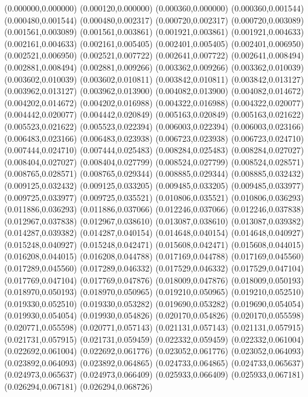 (0.000000,0.000000)
(0.000120,0.000000)
(0.000360,0.000000)
(0.000360,0.001544)
(0.000480,0.001544)
(0.000480,0.002317)
(0.000720,0.002317)
(0.000720,0.003089)
(0.001561,0.003089)
(0.001561,0.003861)
(0.001921,0.003861)
(0.001921,0.004633)
(0.002161,0.004633)
(0.002161,0.005405)
(0.002401,0.005405)
(0.002401,0.006950)
(0.002521,0.006950)
(0.002521,0.007722)
(0.002641,0.007722)
(0.002641,0.008494)
(0.002881,0.008494)
(0.002881,0.009266)
(0.003362,0.009266)
(0.003362,0.010039)
(0.003602,0.010039)
(0.003602,0.010811)
(0.003842,0.010811)
(0.003842,0.013127)
(0.003962,0.013127)
(0.003962,0.013900)
(0.004082,0.013900)
(0.004082,0.014672)
(0.004202,0.014672)
(0.004202,0.016988)
(0.004322,0.016988)
(0.004322,0.020077)
(0.004442,0.020077)
(0.004442,0.020849)
(0.005163,0.020849)
(0.005163,0.021622)
(0.005523,0.021622)
(0.005523,0.022394)
(0.006003,0.022394)
(0.006003,0.023166)
(0.006483,0.023166)
(0.006483,0.023938)
(0.006723,0.023938)
(0.006723,0.024710)
(0.007444,0.024710)
(0.007444,0.025483)
(0.008284,0.025483)
(0.008284,0.027027)
(0.008404,0.027027)
(0.008404,0.027799)
(0.008524,0.027799)
(0.008524,0.028571)
(0.008765,0.028571)
(0.008765,0.029344)
(0.008885,0.029344)
(0.008885,0.032432)
(0.009125,0.032432)
(0.009125,0.033205)
(0.009485,0.033205)
(0.009485,0.033977)
(0.009725,0.033977)
(0.009725,0.035521)
(0.010806,0.035521)
(0.010806,0.036293)
(0.011886,0.036293)
(0.011886,0.037066)
(0.012246,0.037066)
(0.012246,0.037838)
(0.012967,0.037838)
(0.012967,0.038610)
(0.013087,0.038610)
(0.013087,0.039382)
(0.014287,0.039382)
(0.014287,0.040154)
(0.014648,0.040154)
(0.014648,0.040927)
(0.015248,0.040927)
(0.015248,0.042471)
(0.015608,0.042471)
(0.015608,0.044015)
(0.016208,0.044015)
(0.016208,0.044788)
(0.017169,0.044788)
(0.017169,0.045560)
(0.017289,0.045560)
(0.017289,0.046332)
(0.017529,0.046332)
(0.017529,0.047104)
(0.017769,0.047104)
(0.017769,0.047876)
(0.018009,0.047876)
(0.018009,0.050193)
(0.018970,0.050193)
(0.018970,0.050965)
(0.019210,0.050965)
(0.019210,0.052510)
(0.019330,0.052510)
(0.019330,0.053282)
(0.019690,0.053282)
(0.019690,0.054054)
(0.019930,0.054054)
(0.019930,0.054826)
(0.020170,0.054826)
(0.020170,0.055598)
(0.020771,0.055598)
(0.020771,0.057143)
(0.021131,0.057143)
(0.021131,0.057915)
(0.021731,0.057915)
(0.021731,0.059459)
(0.022332,0.059459)
(0.022332,0.061004)
(0.022692,0.061004)
(0.022692,0.061776)
(0.023052,0.061776)
(0.023052,0.064093)
(0.023892,0.064093)
(0.023892,0.064865)
(0.024733,0.064865)
(0.024733,0.065637)
(0.024973,0.065637)
(0.024973,0.066409)
(0.025933,0.066409)
(0.025933,0.067181)
(0.026294,0.067181)
(0.026294,0.068726)
